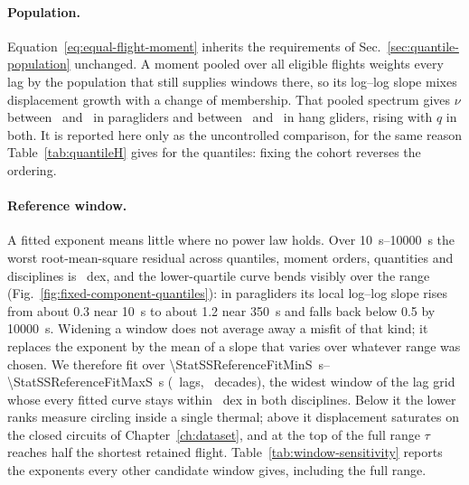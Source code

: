 \paragraph{Population.}
Equation~\eqref{eq:equal-flight-moment} inherits the requirements of
Sec.~\ref{sec:quantile-population} unchanged. A moment pooled over all eligible flights
weights every lag by the population that still supplies windows there, so its log--log
slope mixes displacement growth with a change of membership. That pooled spectrum gives
$\nu$ between \StatRevParaPooledMomentNuMin\ and \StatRevParaPooledMomentNuMax\ in
paragliders and between \StatRevHangPooledMomentNuMin\ and
\StatRevHangPooledMomentNuMax\ in hang gliders, rising with $q$ in both. It is reported
here only as the uncontrolled comparison, for the same reason
Table~\ref{tab:quantileH} gives for the quantiles: fixing the cohort reverses the
ordering.

\paragraph{Reference window.}
A fitted exponent means little where no power law holds. Over
\SIrange{10}{10000}{\second} the worst root-mean-square residual across quantiles,
moment orders, quantities and disciplines is \StatSSFullWorstRmsDex\ dex, and the
lower-quartile curve bends visibly over the range
(Fig.~\ref{fig:fixed-component-quantiles}): in paragliders its local log--log slope
rises from about \num{0.3} near \SI{10}{\second} to about \num{1.2} near
\SI{350}{\second} and falls back below \num{0.5} by \SI{10000}{\second}. Widening a window does not average away a
misfit of that kind; it replaces the exponent by the mean of a slope that varies over
whatever range was chosen. We therefore fit over
\SIrange{\StatSSReferenceFitMinS}{\StatSSReferenceFitMaxS}{\second}
(\StatSSReferenceLagCount\ lags, \StatSSReferenceDecades\ decades), the widest window
of the lag grid whose every fitted curve stays within \StatSSReferenceWorstRmsDex\ dex
in both disciplines. Below it the lower ranks measure circling inside a single thermal;
above it displacement saturates on the closed circuits of Chapter~\ref{ch:dataset},
and at the top of the full range $\tau$ reaches half the shortest retained flight.
Table~\ref{tab:window-sensitivity} reports the exponents every other candidate window
gives, including the full range.

\begin{table}[tb]
 \centering\small
 \caption{Radial contrasts as a function of the fitted lag window, fixed population.
 Each row is the widest window of the lag grid meeting a residual tolerance, with the
 tolerance it actually achieves; the last row is the full range. Both contrasts keep
 their sign at every width, and both shrink towards zero as the window takes in the
 regimes at its ends.}
 \label{tab:window-sensitivity}
 
\end{table}

